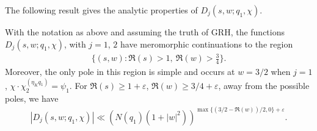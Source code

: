 \documentclass[twoside,leqno,10pt, A4]{amsart}
\begin{document}
The following result gives the analytic properties of $D_j(s, w;q_1, \chi)$.
\begin{lemma}
\label{Estimate For D(w,t)}
 With the notation as above and assuming the truth of GRH, the functions $D_j(s, w; q_1, \chi)$, with $j=1$, $2$ have meromorphic
continuations to the region
\begin{align}
\label{Dregion}
		\{(s,w): \Re(s)>1, \ \Re(w)> \tfrac{3}{4} \}.
\end{align}
    Moreover, the only pole in this region is simple and occurs at $w = 3/2$ when $j=1$, $\chi \cdot \chi^{(\eta_K q_1)}_2=\psi_1$.  For $\Re(s) \geq
1+\varepsilon$, $\Re(w) \geq 3/4+\varepsilon$, away from the possible
poles, we have
\begin{align}
\label{Diest}
			|D_j(s, w; q_1, \chi)|\ll (N(q_1)(1+|w|^2))^{\max \{ (3/2-\Re(w))/2, 0 \}+\varepsilon}.
\end{align}		
\end{lemma}
\end{document}

